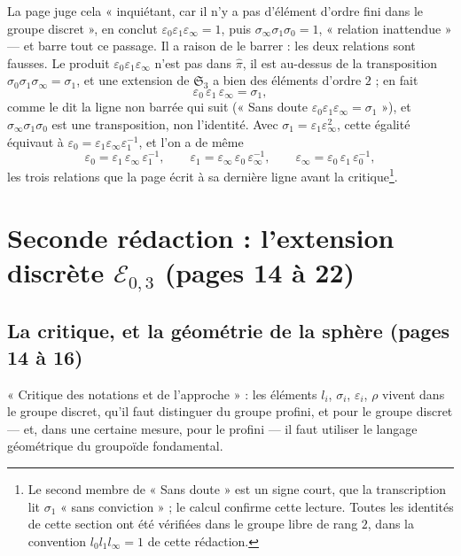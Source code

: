 \documentclass[11pt,a4paper]{article}
\begin{document}
La page juge cela « inquiétant, car il n'y a pas d'élément d'ordre fini dans le
groupe discret », en conclut $\varepsilon_0\varepsilon_1\varepsilon_\infty = 1$,
puis $\sigma_\infty\sigma_1\sigma_0 = 1$, « relation inattendue » — et barre
tout ce passage. Il a raison de le barrer : les deux relations sont fausses. Le
produit $\varepsilon_0\varepsilon_1\varepsilon_\infty$ n'est pas dans
$\widehat{\pi}$, il est au-dessus de la transposition $\sigma_0\sigma_1
\sigma_\infty = \sigma_1$, et une extension de $\mathfrak{S}_3$ a bien des
éléments d'ordre $2$ ; en fait
\[
\varepsilon_0\,\varepsilon_1\,\varepsilon_\infty = \sigma_1 ,
\]
comme le dit la ligne non barrée qui suit (« Sans doute
$\varepsilon_0\varepsilon_1\varepsilon_\infty = \sigma_1$ »), et
$\sigma_\infty\sigma_1\sigma_0$ est une transposition, non l'identité. Avec
$\sigma_1 = \varepsilon_1\varepsilon_\infty^2$, cette égalité équivaut à
$\varepsilon_0 = \varepsilon_1\varepsilon_\infty\varepsilon_1^{-1}$, et l'on a
de même
\[
\varepsilon_0 = \varepsilon_1\,\varepsilon_\infty\,\varepsilon_1^{-1}, \qquad
\varepsilon_1 = \varepsilon_\infty\,\varepsilon_0\,\varepsilon_\infty^{-1},
\qquad \varepsilon_\infty = \varepsilon_0\,\varepsilon_1\,\varepsilon_0^{-1},
\]
les trois relations que la page écrit à sa dernière ligne avant la
critique\footnote{Le second membre de « Sans doute » est un signe court, que la
transcription lit $\sigma_1$ « sans conviction » ; le calcul confirme cette
lecture. Toutes les identités de cette section ont été vérifiées dans le
groupe libre de rang $2$, dans la convention $l_0 l_1 l_\infty = 1$ de cette
rédaction.}.

\section*{Seconde rédaction : l'extension discrète $\mathcal{E}_{0,3}$ (pages 14
à 22)}

\subsection*{La critique, et la géométrie de la sphère (pages 14 à 16)}

« Critique des notations et de l'approche » : les éléments $l_i$, $\sigma_i$,
$\varepsilon_i$, $\rho$ vivent dans le groupe discret, qu'il faut distinguer du
groupe profini, et pour le groupe discret — et, dans une certaine mesure, pour
le profini — il faut utiliser le langage géométrique du groupoïde fondamental.
\end{document}

